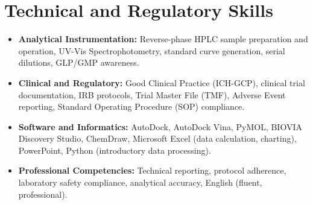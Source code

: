 \documentclass[letterpaper,10pt]{article}
\begin{document}
\section{Technical and Regulatory Skills}
\vspace{1pt}
\begin{itemize}[leftmargin=0.15in, label={}, itemsep=1pt, parsep=0pt]

  \small \item \textbf{Analytical Instrumentation:} Reverse-phase HPLC sample preparation and operation, UV-Vis Spectrophotometry, standard curve generation, serial dilutions, GLP/GMP awareness.

  \small \item \textbf{Clinical and Regulatory:} Good Clinical Practice (ICH-GCP), clinical trial documentation, IRB protocols, Trial Master File (TMF), Adverse Event reporting, Standard Operating Procedure (SOP) compliance.

  \small \item \textbf{Software and Informatics:} AutoDock, AutoDock Vina, PyMOL, BIOVIA Discovery Studio, ChemDraw, Microsoft Excel (data calculation, charting), PowerPoint, Python (introductory data processing).

  \small \item \textbf{Professional Competencies:} Technical reporting, protocol adherence, laboratory safety compliance, analytical accuracy, English (fluent, professional).

\end{itemize}
\end{document}
